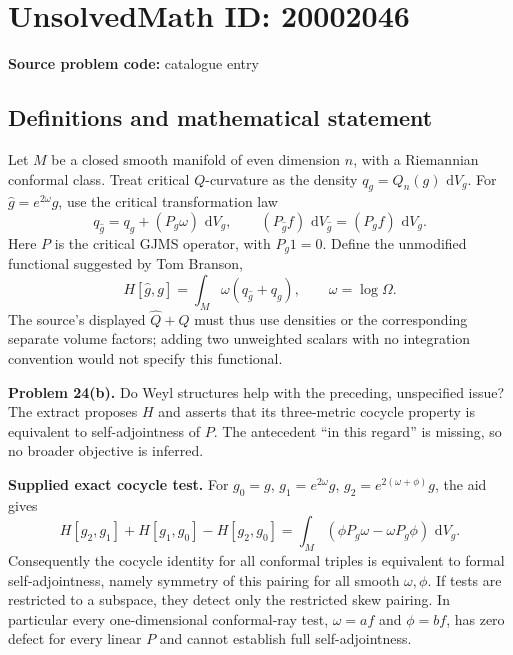 \documentclass[11pt]{article}
\newcommand{\dd}{\,\mathrm{d}}
\begin{document}
\section*{UnsolvedMath ID: 20002046}
\textbf{Source problem code:} catalogue entry
\subsection{Definitions and mathematical statement}
Let $M$ be a closed smooth manifold of even dimension $n$, with a Riemannian conformal class. Treat critical $Q$-curvature as the density $q_g=Q_n(g)\,\dd V_g$. For $\widehat g=e^{2\omega}g$, use the critical transformation law
\[
 q_{\widehat g}=q_g+(P_g\omega)\,\dd V_g,
 \qquad (P_{\widehat g}f)\,\dd V_{\widehat g}
                 =(P_gf)\,\dd V_g.
\]
Here $P$ is the critical GJMS operator, with $P_g1=0$. Define the unmodified functional suggested by Tom Branson,
\[
 H[\widehat g,g]=\int_M\omega(q_{\widehat g}+q_g),
 \qquad \omega=\log\Omega.
\]
The source's displayed $\widehat Q+Q$ must thus use densities or the corresponding separate volume factors; adding two unweighted scalars with no integration convention would not specify this functional.

\textbf{Problem 24(b).} Do Weyl structures help with the preceding, unspecified issue? The extract proposes $H$ and asserts that its three-metric cocycle property is equivalent to self-adjointness of $P$. The antecedent ``in this regard'' is missing, so no broader objective is inferred.

\textbf{Supplied exact cocycle test.} For $g_0=g$, $g_1=e^{2\omega}g$, $g_2=e^{2(\omega+\phi)}g$, the aid gives
\[
 H[g_2,g_1]+H[g_1,g_0]-H[g_2,g_0]
   =\int_M(\phi P_g\omega-\omega P_g\phi)\,\dd V_g.
\]
Consequently the cocycle identity for all conformal triples is equivalent to formal self-adjointness, namely symmetry of this pairing for all smooth $\omega,\phi$. If tests are restricted to a subspace, they detect only the restricted skew pairing. In particular every one-dimensional conformal-ray test, $\omega=af$ and $\phi=bf$, has zero defect for every linear $P$ and cannot establish full self-adjointness.
\end{document}
